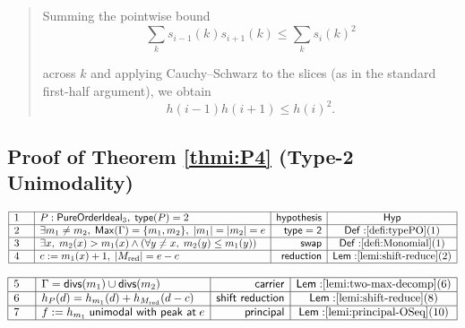 \documentclass[11pt,reqno]{amsart}
\begin{document}
\begin{quotation}
\noindent%
Summing the pointwise bound%
\begin{equation*}
\sum_{k}s_{i-1}(k)s_{i+1}(k)\leq \sum_{k}s_{i}(k)^{2}
\end{equation*}

\bigskip 

\noindent
across $k$ and applying Cauchy--Schwarz to the slices (as in the standard
first-half argument), we obtain%
\begin{equation*}
h(i-1)h(i+1)\leq h(i)^{2}.
\end{equation*}
\end{quotation}

\medskip

\subsection*{Proof of Theorem \protect\ref{thmi:P4} (Type-2 Unimodality)}

\noindent $%
\begin{array}{|m{0.5cm}|l|r|c|}
\hline
1 & P:\mathsf{PureOrderIdeal}_{3},\;\mathsf{type}(P)=2 & \mathsf{hypothesis}
& \mathsf{Hyp} \\ \hline
2 & \exists m_{1}\neq m_{2},\;\mathsf{Max}(\Gamma
)=\{m_{1},m_{2}\},\;|m_{1}|=|m_{2}|=e & \mathsf{type=2} & \mathsf{Def:}\ref%
{defi:typePO}(1) \\ \hline
3 & \exists x,\;m_{2}(x)>m_{1}(x)\wedge (\forall y\neq x,\;m_{2}(y)\leq
m_{1}(y)) & \mathsf{swap} & \mathsf{Def:}\ref{defi:Monomial}(1) \\ \hline
4 & c:=m_{1}(x)+1,\;|M_{\mathrm{red}}|=e-c & \mathsf{reduction} & \mathsf{%
Lem:}\ref{lemi:shift-reduce}(2) \\ \hline
\end{array}%
$

\nointerlineskip\noindent$%
\begin{array}{|m{0.5cm}|l|r|c|}
\hline
5 & \Gamma=\mathsf{divs}(m_{1})\cup\mathsf{divs}(m_{2}) & \mathsf{carrier} & 
\mathsf{Lem:}\ref{lemi:two-max-decomp}(6) \\ \hline
6 & h_{P}(d)=h_{m_{1}}(d)+h_{M_{\mathrm{red}}}(d-c) & \mathsf{shift\
reduction} & \mathsf{Lem:}\ref{lemi:shift-reduce}(8) \\ \hline
7 & f:=h_{m_{1}}\;\mathsf{unimodal\ with\ peak\ at}\;e & \mathsf{principal}
& \mathsf{Lem:}\ref{lemi:principal-OSeq}(10) \\ \hline
\end{array}%
$
\end{document}
